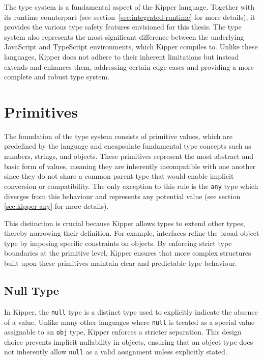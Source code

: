 
The type system is a fundamental aspect of the Kipper language. Together with its runtime counterpart (see section~\ref{sec:integrated-runtime} for more details), it provides the various type safety features envisioned for this thesis. The type system also represents the most significant difference between the underlying JavaScript and TypeScript environments, which Kipper compiles to. Unlike these languages, Kipper does not adhere to their inherent limitations but instead extends and enhances them, addressing certain edge cases and providing a more complete and robust type system.

\section{Primitives}
\label{sec:kipper-primitives}

The foundation of the type system consists of primitive values, which are predefined by the language and encapsulate fundamental type concepts such as numbers, strings, and objects. These primitives represent the most abstract and basic form of values, meaning they are inherently incompatible with one another since they do not share a common parent type that would enable implicit conversion or compatibility. The only exception to this rule is the \lstinline|any| type which diverges from this behaviour and represents any potential value (see section \ref{sec:kipper-any} for more details).

This distinction is crucial because Kipper allows types to extend other types, thereby narrowing their definition. For example, interfaces refine the broad object type by imposing specific constraints on objects. By enforcing strict type boundaries at the primitive level, Kipper ensures that more complex structures built upon these primitives maintain clear and predictable type behaviour.

\subsection{Null Type}

In Kipper, the \lstinline|null| type is a distinct type used to explicitly indicate the absence of a value. Unlike many other languages where \lstinline|null| is treated as a special value assignable to an \lstinline|obj| type, Kipper enforces a stricter separation. This design choice prevents implicit nullability in objects, ensuring that an object type does not inherently allow \lstinline|null| as a valid assignment unless explicitly stated.

